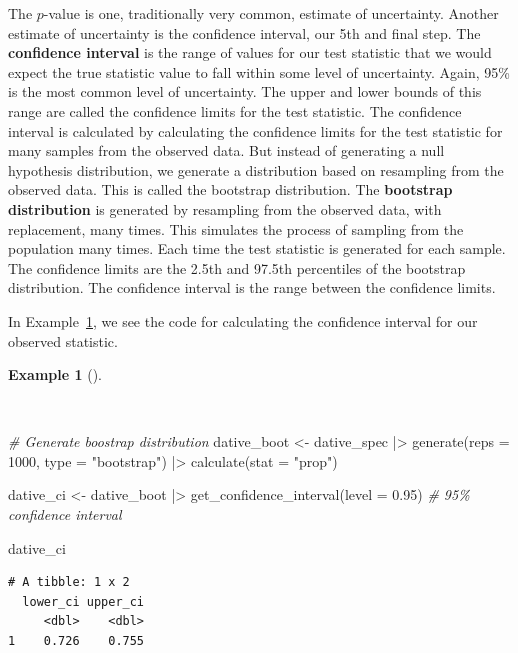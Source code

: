 \documentclass[
  letterpaper,
  krantz1]{latex/krantz-mod}
\newenvironment{Shaded}{\begin{snugshade}}{\end{snugshade}}
\newcommand{\AttributeTok}[1]{\textcolor[rgb]{0.00,0.00,0.00}{#1}}
\newcommand{\CommentTok}[1]{\textcolor[rgb]{0.00,0.00,0.00}{\textit{#1}}}
\newcommand{\DecValTok}[1]{\textcolor[rgb]{0.00,0.00,0.00}{#1}}
\newcommand{\FloatTok}[1]{\textcolor[rgb]{0.00,0.00,0.00}{#1}}
\newcommand{\FunctionTok}[1]{\textcolor[rgb]{0.00,0.00,0.00}{#1}}
\newcommand{\NormalTok}[1]{\textcolor[rgb]{0.00,0.00,0.00}{#1}}
\newcommand{\OtherTok}[1]{\textcolor[rgb]{0.00,0.00,0.00}{#1}}
\newcommand{\SpecialCharTok}[1]{\textcolor[rgb]{0.00,0.00,0.00}{#1}}
\newcommand{\StringTok}[1]{\textcolor[rgb]{0.00,0.00,0.00}{#1}}
\theoremstyle{definition}
\newtheorem{example}{Example}[chapter]
\theoremstyle{definition}
\theoremstyle{remark}
\begin{document}
The \(p\)-value is one, traditionally very common, estimate of
uncertainty. Another estimate of uncertainty is the confidence interval,
our 5th and final step. The \textbf{confidence interval} is the range of
values for our test statistic that we would expect the true statistic
value to fall within some level of uncertainty. Again, 95\% is the most
common level of uncertainty. The upper and lower bounds of this range
are called the confidence limits for the test statistic. The confidence
interval is calculated by calculating the confidence limits for the test
statistic for many samples from the observed data. But instead of
generating a null hypothesis distribution, we generate a distribution
based on resampling from the observed data. This is called the bootstrap
distribution. The \textbf{bootstrap distribution} is generated by
resampling from the observed data, with replacement, many times. This
simulates the process of sampling from the population many times. Each
time the test statistic is generated for each sample. The confidence
limits are the 2.5th and 97.5th percentiles of the bootstrap
distribution. The confidence interval is the range between the
confidence limits.

In Example~\ref{exm-infer-cat-confidence-interval}, we see the code for
calculating the confidence interval for our observed statistic.

\begin{example}[]\protect\hypertarget{exm-infer-cat-confidence-interval}{}\label{exm-infer-cat-confidence-interval}

~

\begin{Shaded}
\begin{Highlighting}[numbers=left,,]
\CommentTok{\# Generate boostrap distribution}
\NormalTok{dative\_boot }\OtherTok{\textless{}{-}}
\NormalTok{  dative\_spec }\SpecialCharTok{|\textgreater{}}
  \FunctionTok{generate}\NormalTok{(}\AttributeTok{reps =} \DecValTok{1000}\NormalTok{, }\AttributeTok{type =} \StringTok{"bootstrap"}\NormalTok{) }\SpecialCharTok{|\textgreater{}}
  \FunctionTok{calculate}\NormalTok{(}\AttributeTok{stat =} \StringTok{"prop"}\NormalTok{)}

\NormalTok{dative\_ci }\OtherTok{\textless{}{-}}
\NormalTok{  dative\_boot }\SpecialCharTok{|\textgreater{}}
  \FunctionTok{get\_confidence\_interval}\NormalTok{(}\AttributeTok{level =} \FloatTok{0.95}\NormalTok{) }\CommentTok{\# 95\% confidence interval}

\NormalTok{dative\_ci}
\end{Highlighting}
\end{Shaded}

\begin{verbatim}
# A tibble: 1 x 2
  lower_ci upper_ci
     <dbl>    <dbl>
1    0.726    0.755
\end{verbatim}

\end{example}
\end{document}

